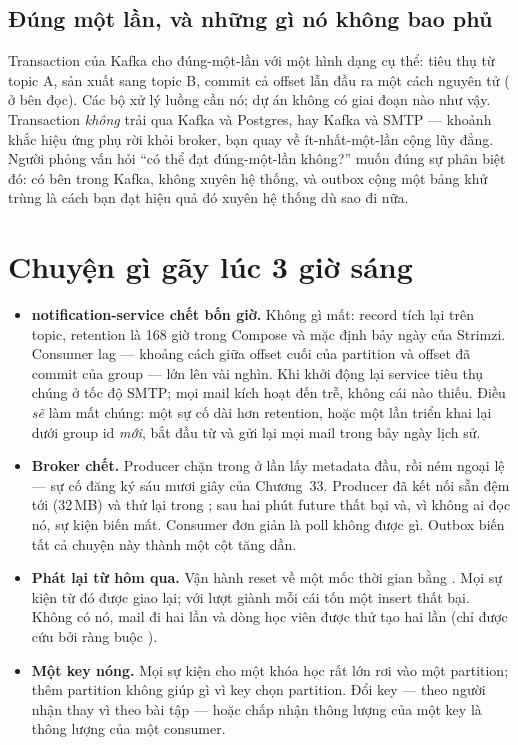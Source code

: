 \subsection{Đúng một lần, và những gì nó không bao phủ}

Transaction của Kafka cho đúng-một-lần với một hình dạng cụ thể: tiêu
thụ từ topic A, sản xuất sang topic B, commit cả offset lẫn đầu ra một
cách nguyên tử ( ở bên đọc). Các
bộ xử lý luồng cần nó; dự án không có giai đoạn nào như vậy. Transaction
\emph{không} trải qua Kafka và Postgres, hay Kafka và SMTP --- khoảnh
khắc hiệu ứng phụ rời khỏi broker, bạn quay về ít-nhất-một-lần cộng lũy
đẳng. Người phỏng vấn hỏi ``có thể đạt đúng-một-lần không?'' muốn đúng
sự phân biệt đó: có bên trong Kafka, không xuyên hệ thống, và outbox
cộng một bảng khử trùng là cách bạn đạt hiệu quả đó xuyên hệ thống dù
sao đi nữa.

\section{Chuyện gì gãy lúc 3 giờ sáng}

\begin{itemize}
  \item \textbf{notification-service chết bốn giờ.} Không gì mất: record
  tích lại trên topic, retention là 168 giờ trong Compose và mặc định
  bảy ngày của Strimzi. Consumer lag --- khoảng cách giữa offset cuối
  của partition và offset đã commit của group --- lớn lên vài nghìn.
  Khi khởi động lại service tiêu thụ chúng ở tốc độ SMTP; mọi mail kích
  hoạt đến trễ, không cái nào thiếu. Điều \emph{sẽ} làm mất chúng: một
  sự cố dài hơn retention, hoặc một lần triển khai lại dưới group id
  \emph{mới}, bắt đầu từ  và gửi lại mọi mail trong bảy
  ngày lịch sử.
  \item \textbf{Broker chết.} Producer chặn trong 
  ở lần lấy metadata đầu, rồi ném ngoại lệ --- sự cố đăng ký sáu mươi
  giây của Chương~33. Producer đã kết nối sẵn đệm tới
   (32\,MB) và thử lại trong
  ; sau hai phút future thất bại và, vì không
  ai đọc nó, sự kiện biến mất. Consumer đơn giản là poll không được gì.
  Outbox biến tất cả chuyện này thành một cột  tăng dần.
  \item \textbf{Phát lại từ hôm qua.} Vận hành reset 
  về một mốc thời gian bằng
  . Mọi sự
  kiện từ đó được giao lại; với lượt giành  mỗi
  cái tốn một insert thất bại. Không có nó, mail đi hai lần và dòng học
  viên được thử tạo hai lần (chỉ được cứu bởi ràng buộc
  ).
  \item \textbf{Một key nóng.} Mọi sự kiện cho một khóa học rất lớn rơi
  vào một partition; thêm partition không giúp gì vì key chọn partition.
  Đổi key --- theo người nhận thay vì theo bài tập --- hoặc chấp nhận
  thông lượng của một key là thông lượng của một consumer.
\end{itemize}

